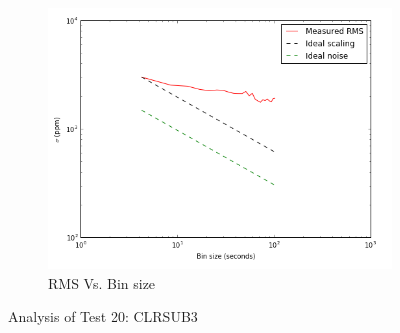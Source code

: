\documentclass{aastex6}
\begin{document}
\begin{figure}[H]
    \begin{subfigure}{3}
        \includegraphics[scale=0.6]{rms_test20}
        \caption{RMS Vs. Bin size}
    \end{subfigure}
    \caption{Analysis of Test 20: CLRSUB3}
\end{figure}
\end{document}
